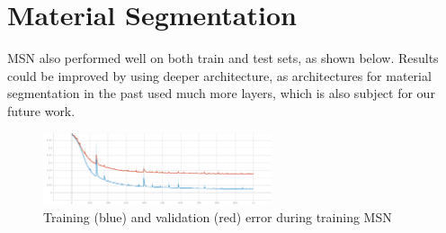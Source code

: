 \section{Material Segmentation}
MSN also performed well on both train and test sets, as shown below. Results could be improved by using deeper architecture, as architectures for material segmentation in the past used much more layers, which is also subject for our future work.
\begin{figure}[H]
    \centerline{\includegraphics[width=0.6\textwidth]{praca/images/Training-MSN.png}}
    \caption[Training and validation error for MSN]{Training (blue) and validation (red) error during training MSN}
    \label{img:training-msn}
\end{figure}
